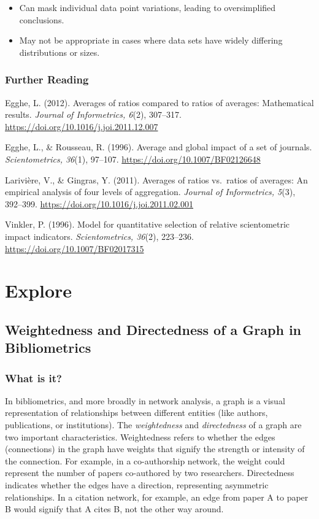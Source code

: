 \documentclass[
  letterpaper,
]{scrreprt}
\providecommand{\tightlist}{%
  \setlength{\itemsep}{0pt}\setlength{\parskip}{0pt}}
\begin{document}
\begin{itemize}
\tightlist
\item
  Can mask individual data point variations, leading to oversimplified
  conclusions.
\item
  May not be appropriate in cases where data sets have widely differing
  distributions or sizes.
\end{itemize}

\section{Further Reading}\label{further-reading-10}

Egghe, L. (2012). Averages of ratios compared to ratios of averages:
Mathematical results. \emph{Journal of Informetrics, 6}(2), 307--317.
\url{https://doi.org/10.1016/j.joi.2011.12.007}

Egghe, L., \& Rousseau, R. (1996). Average and global impact of a set of
journals. \emph{Scientometrics, 36}(1), 97--107.
\url{https://doi.org/10.1007/BF02126648}

Larivière, V., \& Gingras, Y. (2011). Averages of ratios vs.~ratios of
averages: An empirical analysis of four levels of aggregation.
\emph{Journal of Informetrics, 5}(3), 392--399.
\url{https://doi.org/10.1016/j.joi.2011.02.001}

Vinkler, P. (1996). Model for quantitative selection of relative
scientometric impact indicators. \emph{Scientometrics, 36}(2), 223--236.
\url{https://doi.org/10.1007/BF02017315}

\part{Explore}

\chapter{Weightedness and Directedness of a Graph in
Bibliometrics}\label{weightedness-and-directedness-of-a-graph-in-bibliometrics}

\section{What is it?}\label{what-is-it-3}

In bibliometrics, and more broadly in network analysis, a graph is a
visual representation of relationships between different entities (like
authors, publications, or institutions). The \emph{weightedness} and
\emph{directedness} of a graph are two important characteristics.
Weightedness refers to whether the edges (connections) in the graph have
weights that signify the strength or intensity of the connection. For
example, in a co-authorship network, the weight could represent the
number of papers co-authored by two researchers. Directedness indicates
whether the edges have a direction, representing asymmetric
relationships. In a citation network, for example, an edge from paper A
to paper B would signify that A cites B, not the other way around.
\end{document}
